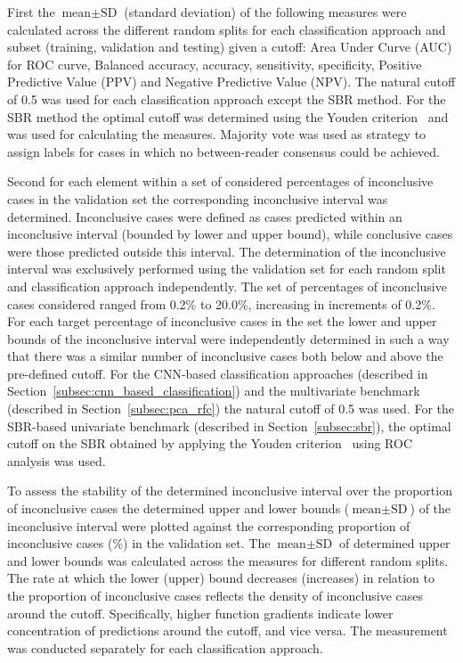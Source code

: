 First the $\text{mean} \pm \text{SD}$ (standard deviation) of the following measures were calculated across
the different random splits for each classification approach and subset (training, validation and testing) given a cutoff: 
Area Under Curve (AUC) for ROC curve, Balanced accuracy, accuracy, sensitivity, specificity, 
Positive Predictive Value (PPV) and Negative Predictive Value (NPV).
The natural cutoff of 0.5 was used for each classification approach except the SBR method.
For the SBR method the optimal cutoff was determined using the Youden criterion~\citep{Youden1950} and was used for
calculating the measures.
Majority vote was used as strategy to assign labels for cases in which no between-reader consensus could be achieved.

Second for each element within a set of considered percentages of inconclusive cases in the validation set 
the corresponding inconclusive interval was determined.
Inconclusive cases were defined as cases predicted within an inconclusive interval 
(bounded by lower and upper bound), while conclusive cases were those predicted outside this interval.
The determination of the inconclusive interval was exclusively performed using the validation set 
for each random split and classification approach independently.
The set of percentages of inconclusive cases considered ranged from 0.2\% to 20.0\%, increasing in increments of 0.2\%.
For each target percentage of inconclusive cases in the set the lower and upper bounds of the inconclusive interval 
were independently determined in such a way that there was a similar number of inconclusive cases both below and above 
the pre-defined cutoff.
For the CNN-based classification approaches (described in Section~\ref{subsec:cnn_based_classification}) and the 
multivariate benchmark (described in Section~\ref{subsec:pca_rfc}) the natural cutoff of 0.5 was used.
For the SBR-based univariate benchmark (described in Section~\ref{subsec:sbr}), 
the optimal cutoff on the SBR obtained by applying the Youden criterion~\citep{Youden1950} using ROC analysis was used.

To assess the stability of the determined inconclusive interval over the proportion of inconclusive cases
the determined upper and lower bounds ($\text{mean} \pm \text{SD}$) of the inconclusive interval
were plotted against the corresponding proportion of inconclusive cases (\%) in the validation set.
The $\text{mean} \pm \text{SD}$ of determined upper and lower bounds was calculated across the measures for 
different random splits.
The rate at which the lower (upper) bound decreases (increases) in relation to the proportion of inconclusive 
cases reflects the density of inconclusive cases around the cutoff.
Specifically, higher function gradients indicate lower concentration of predictions around the cutoff, 
and vice versa.
The measurement was conducted separately for each classification approach.

